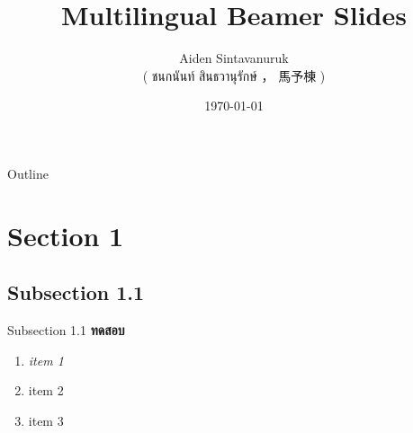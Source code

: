 \documentclass{beamer}
\title{Multilingual Beamer Slides}
\author[shortname]{
	Aiden Sintavanuruk \\ ( ชนกนันท์ สินธวานุรักษ์ ， 馬予棟 ) \inst{1}
}
\institute[shortinst]{\inst{1} affiliation
}
\date{\today}
\begin{document}
\begin{frame}
	\titlepage
\end{frame}

\begin{frame}{Outline}
	\tableofcontents
\end{frame}


\section{Section 1}
\subsection{Subsection 1.1}
\begin{frame}{Subsection 1.1}
	\textbf{ทดสอบ} \cite{hormander_hypoelliptic_1967}
	\begin{enumerate}
		\item<1-> \textit{item 1}
		\item<2-> item 2
		\item<3-> item 3
	\end{enumerate}
\end{frame}

\begin{frame}[allowframebreaks]
	
	\tiny
\end{frame}
\end{document}

